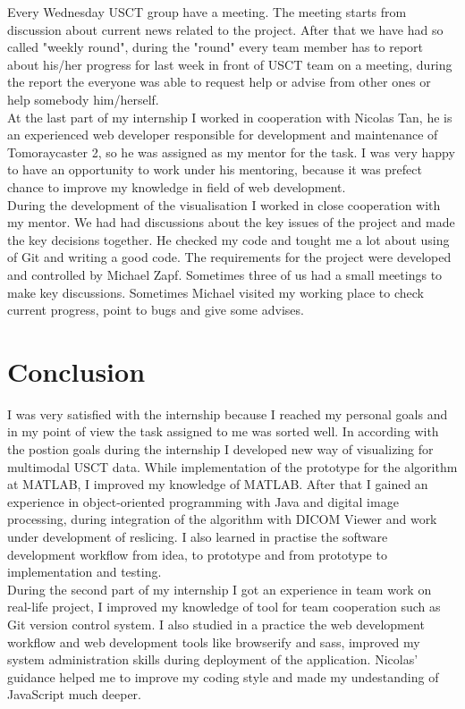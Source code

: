 \documentclass[english]{article}
\begin{document}
Every Wednesday USCT group have a meeting. The meeting starts from discussion about current news related to the project. After that we have had so called "weekly round", during the "round" every team member has to report about his/her progress for last week in front of USCT team on a meeting, during the report the everyone was able to request help or advise from other ones or help somebody him/herself. \\

At the last part of my internship I worked in cooperation with Nicolas Tan, he is an experienced web developer responsible for development and maintenance of Tomoraycaster 2, so he was assigned as my mentor for the task. I was very happy to have an opportunity to work under his mentoring, because it was prefect chance to improve my knowledge in field of web development.\\

During the development of the visualisation I worked in close cooperation with my mentor. We had had discussions about the key issues of the project and made the key decisions together. He checked my code and tought me a lot about using of Git and writing a good code. The requirements for the project were developed and controlled by Michael Zapf. Sometimes three of us had a small meetings to make key discussions. Sometimes Michael visited my working place to check current progress, point to bugs and give some advises.

\section{Conclusion}

I was very satisfied with the internship because I reached my personal goals and in my point of view the task assigned to me was sorted well. In according with the postion goals during the internship I developed new way of visualizing for multimodal USCT data. While implementation of the prototype for the algorithm at MATLAB, I improved my knowledge of MATLAB. After that I gained an experience in object-oriented programming with Java and digital image processing, during integration of the algorithm with DICOM Viewer and work under development of reslicing. I also learned in practise the software development workflow from idea, to prototype and from prototype to implementation and testing.\\

During the second part of my internship I got an experience in team work on real-life project, I improved my knowledge of tool for team cooperation such as Git version control system. I also studied in a practice the web development workflow and web development tools like browserify and sass, improved my system administration skills during deployment of the application. Nicolas' guidance helped me to improve my coding style and made my undestanding of JavaScript much deeper.\\
\end{document}
